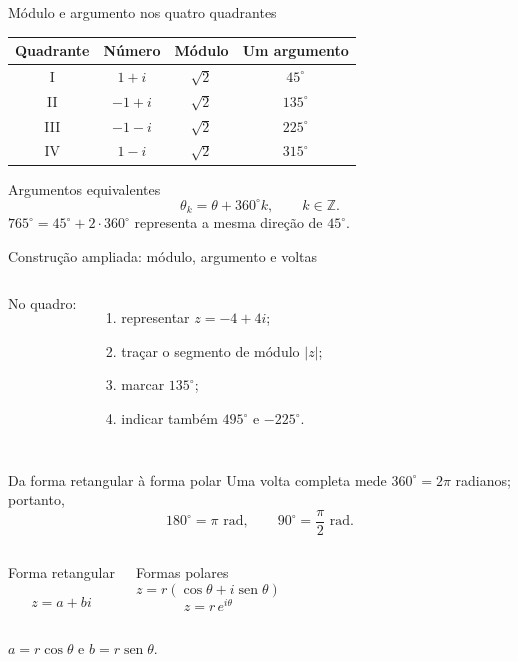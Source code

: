 \documentclass[aspectratio=169]{beamer}
\newcommand{\sen}{\operatorname{sen}}
\begin{document}
\begin{frame}{Módulo e argumento nos quatro quadrantes}
\vspace{-0.4em}
\small
\centering
\renewcommand{\arraystretch}{1.35}
\begin{tabular}{cccc}
\toprule
Quadrante & Número & Módulo & Um argumento \\
\midrule
I   & $1+i$  & $\sqrt2$ & $45^\circ$ \\
II  & $-1+i$ & $\sqrt2$ & $135^\circ$ \\
III & $-1-i$ & $\sqrt2$ & $225^\circ$ \\
IV  & $1-i$  & $\sqrt2$ & $315^\circ$ \\
\bottomrule
\end{tabular}

\vspace{0.55em}
\begin{block}{Argumentos equivalentes}
\[
  \theta_k=\theta+360^\circ k,\qquad k\in\mathbb{Z}.
\]
$765^\circ=45^\circ+2\cdot360^\circ$ representa a mesma direção de $45^\circ$.
\end{block}
\end{frame}

\begin{frame}{Construção ampliada: módulo, argumento e voltas}
\vspace{-0.65em}
\begin{columns}[T,onlytextwidth]
\small
No quadro:
\begin{enumerate}
  \item representar $z=-4+4i$;
  \item traçar o segmento de módulo $|z|$;
  \item marcar $135^\circ$;
  \item indicar também $495^\circ$ e $-225^\circ$.
\end{enumerate}

\centering

\end{columns}
\end{frame}

\begin{frame}{Da forma retangular à forma polar}
\vspace{-1cm}
\small
Uma volta completa mede $360^\circ=2\pi$ radianos; portanto,
\[
  180^\circ=\pi\text{ rad},\qquad 90^\circ=\frac{\pi}{2}\text{ rad}.
\]
\begin{columns}[T,onlytextwidth]
\begin{block}{Forma retangular}

\[
  z=a+bi
\]
\end{block}
\begin{block}{Formas polares}
\[
  z=r(\cos\theta+i\sen\theta)
\]
\[
  z=r\,e^{i\theta}
\]
\end{block}
\end{columns}
\centering
\vspace{1cm}
$a=r\cos\theta$ e $b=r\sen\theta$.
\end{frame}
\end{document}
